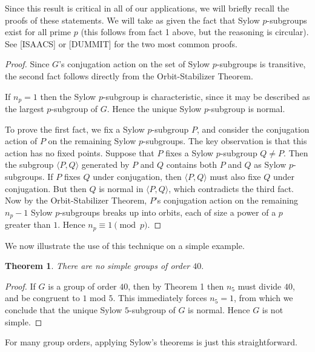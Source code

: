 \documentclass[11pt,
oneside]{article} %
\newtheorem{theorem}{Theorem}
\begin{document}
Since this result is critical in all of our applications, we will
briefly recall the proofs of these statements.  We will take as given
the fact that Sylow $p$-subgroups exist for all prime $p$ (this
follows from fact 1 above, but the reasoning is circular).  See
[ISAACS] or [DUMMIT] for the two most common proofs.

\begin{proof}
  Since $G$'s conjugation action on the set of Sylow $p$-subgroups is
  transitive, the second fact follows directly from the
  Orbit-Stabilizer Theorem.

If $n_p = 1$ then the Sylow $p$-subgroup is characteristic, since it
may be described as the largest $p$-subgroup of $G$.  Hence the unique
Sylow $p$-subgroup is normal.

To prove the first fact, we fix a Sylow $p$-subgroup $P$, and consider
the conjugation action of $P$ on the remaining Sylow $p$-subgroups.
The key observation is that this action has no fixed points.  Suppose
that $P$ fixes a Sylow $p$-subgroup $Q \neq P.$ Then the subgroup
$\langle P, Q \rangle$ generated by $P$ and $Q$ contains both $P$ and
$Q$ as Sylow $p$-subgroups.  If $P$ fixes $Q$ under conjugation, then
$\langle P, Q \rangle$ must also fixe $Q$ under conjugation.  But then
$Q$ is normal in $\langle P, Q \rangle$, which contradicts the third
fact.  Now by the Orbit-Stabilizer Theorem, $P$'s conjugation action
on the remaining $n_p - 1$ Sylow $p$-subgroups breaks up into orbits,
each of size a power of a $p$ greater than $1$.  Hence
$n_p \equiv 1 \pmod p.$
\end{proof}

We now illustrate the use of this technique on a simple example.

\begin{theorem}
There are no simple groups of order $40.$
\end{theorem}

\begin{proof}
  If $G$ is a group of order $40$, then by Theorem 1 then $n_5$ must
  divide $40$, and be congruent to $1$ mod $5$.  This immediately
  forces $n_5 = 1$, from which we conclude that the unique Sylow
  $5$-subgroup of $G$ is normal.  Hence $G$ is not simple.
\end{proof}

For many group orders, applying Sylow's theorems is just this straightforward.
\end{document}

